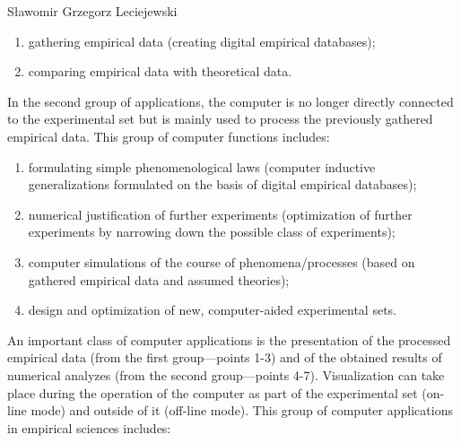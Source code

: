 \begin{artengenv}{Sławomir Grzegorz Leciejewski}
\begin{enumerate}
\item gathering empirical data (creating digital empirical databases);

\item comparing empirical data with theoretical data.

\end{enumerate}

In the second group of applications, the computer is no longer directly connected to the experimental set but is mainly used to process the previously gathered empirical data. This group of computer functions includes:



\setcounter{saveenum}{\value{enumi}}

\begin{enumerate}

\setcounter{enumi}{\value{saveenum}}

\item formulating simple phenomenological laws (computer inductive generalizations formulated on the basis of digital empirical databases);

\item numerical justification of further experiments (optimization of further experiments by narrowing down the possible class of experiments);

\item computer simulations of the course of phenomena/processes (based on gathered empirical data and assumed theories);

\item design and optimization of new, computer-aided experimental sets.

\end{enumerate}

An important class of computer applications is the presentation of the processed empirical data (from the first group---points 1-3) and of the obtained results of numerical analyzes (from the second group---points 4-7). Visualization can take place during the operation of the computer as part of the experimental set (on-line mode) and outside of it (off-line mode). This group of computer applications in empirical sciences includes:

\enlargethispage{1.5\baselineskip}

\setcounter{saveenum}{\value{enumi}}

\begin{enumerate}

\setcounter{enumi}{\value{saveenum}}


\end{enumerate}
\end{artengenv}
